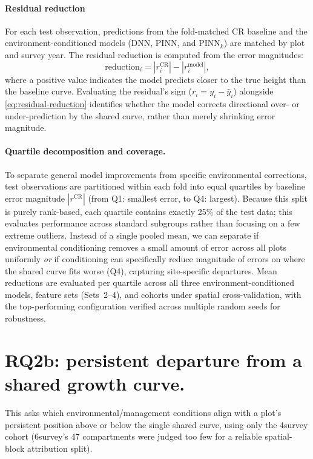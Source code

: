 \documentclass[11pt,a4paper]{report}
\begin{document}
\paragraph*{Residual reduction}
For each test observation, predictions from the fold-matched CR baseline and the environment-conditioned models (DNN, PINN, and PINN$_k$) are matched by plot and survey year. The residual reduction is computed from the error magnitudes:
\begin{equation}
\text{reduction}_i = \left|r_i^{\text{CR}}\right| - \left|r_i^{\text{model}}\right|,
\label{eq:residual-reduction}
\end{equation}
where a positive value indicates the model predicts closer to the true height than the baseline curve. Evaluating the residual's sign ($r_i = y_i - \hat{y}_i$) alongside \eqref{eq:residual-reduction} identifies whether the model corrects directional over- or under-prediction by the shared curve, rather than merely shrinking error magnitude. 

\paragraph*{Quartile decomposition and coverage.} To separate general model improvements from specific environmental corrections, test observations are partitioned within each fold into equal quartiles by baseline error magnitude $|r^{\text{CR}}|$ (from Q1: smallest error, to Q4: largest). Because this split is purely rank-based, each quartile contains exactly 25\% of the test data; this evaluates performance across standard subgroups rather than focusing on a few extreme outliers. Instead of a single pooled mean, we can separate if environmental conditioning removes a small amount of error across all plots uniformly \textit{or} if conditioning can specifically reduce magnitude of errors on where the shared curve fits worse (Q4), capturing site-specific departures. Mean reductions are evaluated per quartile across all three environment-conditioned models, feature sets (Sets~2--4), and cohorts under spatial cross-validation, with the top-performing configuration verified across multiple random seeds for robustness. %

\section*{RQ2b: persistent departure from a shared growth curve.}
This asks which environmental/management conditions align with a plot's persistent position above or below the single shared curve, using only the 4survey cohort (6survey's 47 compartments were judged too few for a reliable spatial-block attribution split).
\end{document}
